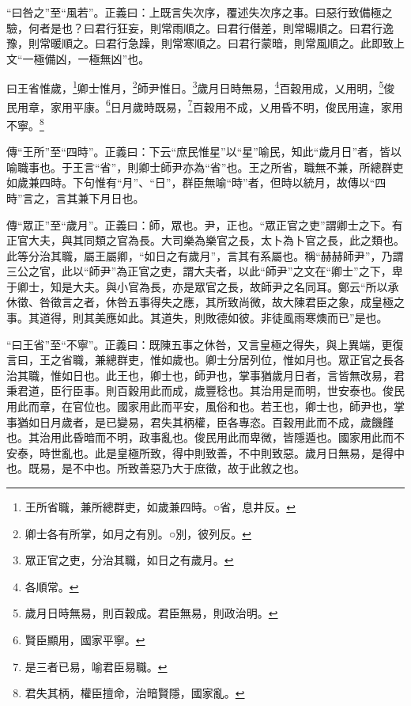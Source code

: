 {\noindent\shu{}\fzkt “曰咎之”至“風若”。正義曰：上既言失次序，覆述失次序之事。曰惡行致備極之驗，何者是也？曰君行狂妄，則常雨順之。曰君行僣差，則常暘順之。曰君行逸豫，則常暖順之。曰君行急躁，則常寒順之。曰君行蒙暗，則常風順之。此即致上文“一極備凶，一極無凶”也。 \par}

曰王省惟歲，\footnote{王所省職，兼所總群吏，如歲兼四時。○省，息井反。}卿士惟月，\footnote{卿士各有所掌，如月之有別。○別，彼列反。}師尹惟日。\footnote{眾正官之吏，分治其職，如日之有歲月。}歲月日時無易，\footnote{各順常。}百穀用成，乂用明，\footnote{歲月日時無易，則百穀成。君臣無易，則政治明。}俊民用章，家用平康。\footnote{賢臣顯用，國家平寧。}日月歲時既易，\footnote{是三者已易，喻君臣易職。}百穀用不成，乂用昏不明，俊民用違，家用不寧。\footnote{君失其柄，權臣擅命，治暗賢隱，國家亂。}

{\noindent\zhuan{}\fzbyks 傳“王所”至“四時”。正義曰：下云“庶民惟星”以“星”喻民，知此“歲月日”者，皆以喻職事也。于王言“省”，則卿士師尹亦為“省”也。王之所省，職無不兼，所總群吏如歲兼四時。下句惟有“月”、“日”，群臣無喻“時”者，但時以統月，故傳以“四時”言之，言其兼下月日也。 \par}

{\noindent\zhuan{}\fzbyks 傳“眾正”至“歲月”。正義曰：師，眾也。尹，正也。“眾正官之吏”謂卿士之下。有正官大夫，與其同類之官為長。大司樂為樂官之長，太卜為卜官之長，此之類也。此等分治其職，屬王屬卿，“如日之有歲月”，言其有系屬也。稱“赫赫師尹”，乃謂三公之官，此以“師尹”為正官之吏，謂大夫者，以此“師尹”之文在“卿士”之下，卑于卿士，知是大夫。與小官為長，亦是眾官之長，故師尹之名同耳。鄭云“所以承休徵、咎徵言之者，休咎五事得失之應，其所致尚微，故大陳君臣之象，成皇極之事。其道得，則其美應如此。其道失，則敗德如彼。非徒風雨寒燠而已”是也。 \par}

{\noindent\shu{}\fzkt “曰王省”至“不寧”。正義曰：既陳五事之休咎，又言皇極之得失，與上異端，更復言曰，王之省職，兼總群吏，惟如歲也。卿士分居列位，惟如月也。眾正官之長各治其職，惟如日也。此王也，卿士也，師尹也，掌事猶歲月日者，言皆無改易，君秉君道，臣行臣事。則百穀用此而成，歲豐稔也。其治用是而明，世安泰也。俊民用此而章，在官位也。國家用此而平安，風俗和也。若王也，卿士也，師尹也，掌事猶如日月歲者，是已變易，君失其柄權，臣各專恣。百穀用此而不成，歲饑饉也。其治用此昏暗而不明，政事亂也。俊民用此而卑微，皆隱遁也。國家用此而不安泰，時世亂也。此是皇極所致，得中則致善，不中則致惡。歲月日無易，是得中也。既易，是不中也。所致善惡乃大于庶徵，故于此敘之也。 \par}

